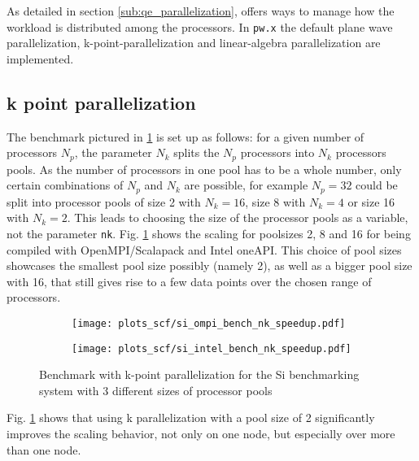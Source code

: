 \documentclass[main.tex]{subfiles}
\begin{document}
As detailed in section \ref{sub:qe_parallelization}, \QE offers ways to manage how the workload is distributed among the processors.
In \texttt{pw.x} the default plane wave parallelization, k-point-parallelization and linear-algebra parallelization are implemented.

\subsection{k point parallelization}

The benchmark pictured in \ref{fig:scaling_nk_si} is set up as follows: for a given number of processors \(N_p\), the parameter \(N_k\) splits the \(N_p\) processors into \(N_k\) processors pools.
As the number of processors in one pool has to be a whole number, only certain combinations of \(N_p\) and \(N_k\) are possible, for example \(N_p = 32\) could be split into processor pools of size 2 with \(N_k = 16\), size 8 with \(N_k = 4\) or size 16 with \(N_k = 2\).
This leads to choosing the size of the processor pools as a variable, not the parameter \texttt{nk}.
Fig. \ref{fig:scaling_nk_si} shows the scaling for poolsizes 2, 8 and 16 for \QE being compiled with OpenMPI/Scalapack and Intel oneAPI.
This choice of pool sizes showcases the smallest pool size possibly (namely 2), as well as a bigger pool size with 16, that still gives rise to a few data points over the chosen range of processors.

\begin{figure}[ht!]
\begin{subfigure}[b]{0.49\textwidth}
    \centering
    \texttt{[image: plots\_scf/si\_ompi\_bench\_nk\_speedup.pdf]}
\end{subfigure}
\begin{subfigure}[b]{0.49\textwidth}
    \centering
    \texttt{[image: plots\_scf/si\_intel\_bench\_nk\_speedup.pdf]}
\end{subfigure}
\caption{Benchmark with k-point parallelization for the Si benchmarking system with 3 different sizes of processor pools}
\label{fig:scaling_nk_si}
\end{figure}

Fig. \ref{fig:scaling_nk_si} shows that using k parallelization with a pool size of 2 significantly improves the scaling behavior, not only on one node, but especially over more than one node.

\end{document}
